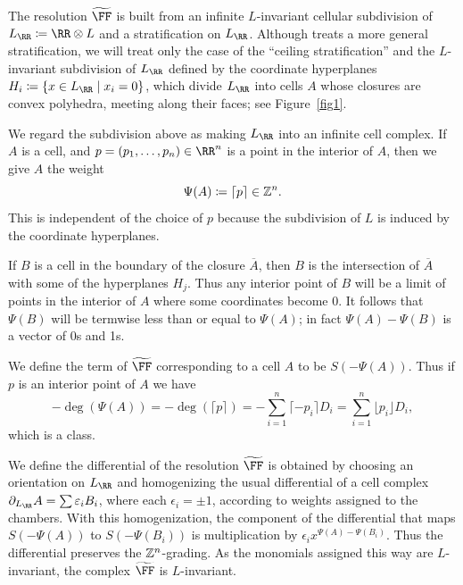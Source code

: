 \documentclass{amsart}
\begin{document}
The resolution $\tF$ is built from an infinite $L$-invariant cellular subdivision of $L_\RR \ce \RR\otimes L$
and a stratification on $L_{\RR}$.  Although \cite{BCHSY} treats a more general stratification, we will
treat only the case of  the ``ceiling stratification'' and the $L$-invariant subdivision of $L_\RR$ defined by the coordinate hyperplanes $H_i \ce \{x\in L_\RR\mid x_i = 0\}$, which divide $L_\RR$ into cells $A$ whose closures are convex polyhedra, meeting along their faces; see Figure~\ref{fig1}.


We regard the subdivision above as making $L_{\RR}$ into an infinite cell complex.
If $A$ is a cell, and $p = (p_1,\dots, p_n) \in \RR^n$ is a point in the
interior of $A$, then we give $A$ the weight 
$$
\Psi(A) \coloneqq \lceil p \rceil \in \mathbb Z^{n}.
$$
This is independent of the choice of $p$ because the subdivision of $L$ is induced by the coordinate hyperplanes.
 
If $B$ is 
a cell in the boundary of the closure $\overline A$, then $B$ is the intersection of
$\overline A$ with some of the hyperplanes $H_{j}$. Thus any interior point of $B$ will
be a limit of points in the interior of $A$ where some coordinates become 0. It follows that
$\Psi(B)$ will be termwise less than or equal to $\Psi(A)$; in fact $\Psi(A) - \Psi(B)$ is a vector
of 0s and 1s.

We define the term of $\tF$ corresponding to a cell $A$  to be $S(-\Psi(A))$. Thus if $p$ is an interior point of $A$
we have
\[
-\deg(\Psi(A)) = -\deg( \lceil {p}\rceil) = -\sum_{i=1}^n\lceil -p_i\rceil D_i=\sum_{i=1}^n\lfloor p_i\rfloor D_i,
\] 
which is a \BT class.

 We define the differential of the resolution $\tF$ is obtained by choosing
an orientation on $L_\RR$ and homogenizing the usual differential of
a cell complex $\partial_{L_{\RR}}A = \sum\epsilon_{i}B_{i}$, where each $\epsilon_{i} = \pm 1$, according to weights assigned to the chambers. With this homogenization, the component of the differential that maps $S(-\Psi(A))$ to $S(-\Psi(B_{i}))$ is multiplication by $\epsilon_{i}x^{\Psi(A) - \Psi(B_{i})}$. Thus the
differential preserves the $\mathbb Z^{n}$-grading. As the monomials assigned this way are $L$-invariant, the complex $\tF$ is $L$-invariant.
\end{document}
